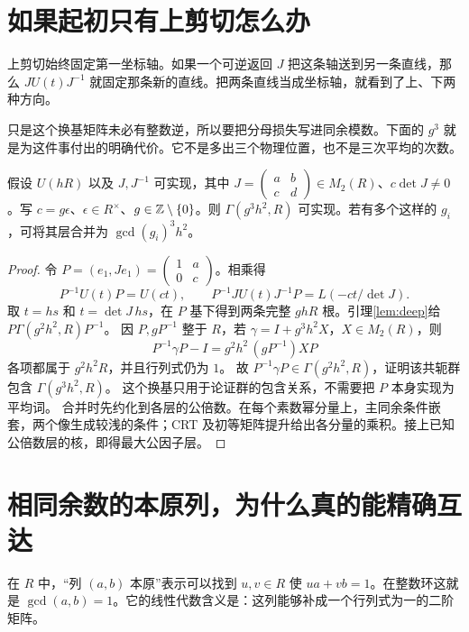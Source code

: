 \section{如果起初只有上剪切怎么办}
上剪切始终固定第一坐标轴。如果一个可逆返回 $J$ 把这条轴送到另一条直线，那么 $JU(t)J^{-1}$ 就固定那条新的直线。把两条直线当成坐标轴，就看到了上、下两种方向。

只是这个换基矩阵未必有整数逆，所以要把分母损失写进同余模数。下面的 $g^3$ 就是为这件事付出的明确代价。它不是多出三个物理位置，也不是三次平均的次数。
\begin{lemma}[横向返回与换基的分母损失]\label{lem:transverse}
假设 $U(hR)$ 以及 $J,J^{-1}$ 可实现，其中 $J=\left(\begin{smallmatrix}a&b\\c&d\end{smallmatrix}\right)\in M_2(R)$、$c\det J\ne0$。写 $c=g\epsilon$、$\epsilon\in R^\times$、$g\in\mathbb Z\setminus\{0\}$。则 $\Gamma(g^3h^2,R)$ 可实现。若有多个这样的 $g_i$，可将其层合并为 $\gcd(g_i)^3h^2$。
\end{lemma}
\begin{proof}
令 $P=(e_1,Je_1)=\left(\begin{smallmatrix}1&a\\0&c\end{smallmatrix}\right)$。相乘得
\[
P^{-1}U(t)P=U(ct),\qquad
P^{-1}JU(t)J^{-1}P=L(-ct/\det J).
\]
取 $t=hs$ 和 $t=\det J\,hs$，在 $P$ 基下得到两条完整 $ghR$ 根。引理\ref{lem:deep}给 $P\Gamma(g^2h^2,R)P^{-1}$。
因 $P,gP^{-1}$ 整于 $R$，若 $\gamma=I+g^3h^2X$，$X\in M_2(R)$，则
\[
P^{-1}\gamma P-I
=g^2h^2\,(gP^{-1})XP
\]
各项都属于 $g^2h^2R$，并且行列式仍为 $1$。
故 $P^{-1}\gamma P\in\Gamma(g^2h^2,R)$，证明该共轭群包含 $\Gamma(g^3h^2,R)$。
这个换基只用于论证群的包含关系，不需要把 $P$ 本身实现为平均词。
合并时先约化到各层的公倍数。在每个素数幂分量上，主同余条件嵌套，两个像生成较浅的条件；CRT 及初等矩阵提升给出各分量的乘积。接上已知公倍数层的核，即得最大公因子层。
\end{proof}

\section{相同余数的本原列，为什么真的能精确互达}
在 $R$ 中，“列 $(a,b)$ 本原”表示可以找到 $u,v\in R$ 使 $ua+vb=1$。在整数环这就是 $\gcd(a,b)=1$。它的线性代数含义是：这列能够补成一个行列式为一的二阶矩阵。

